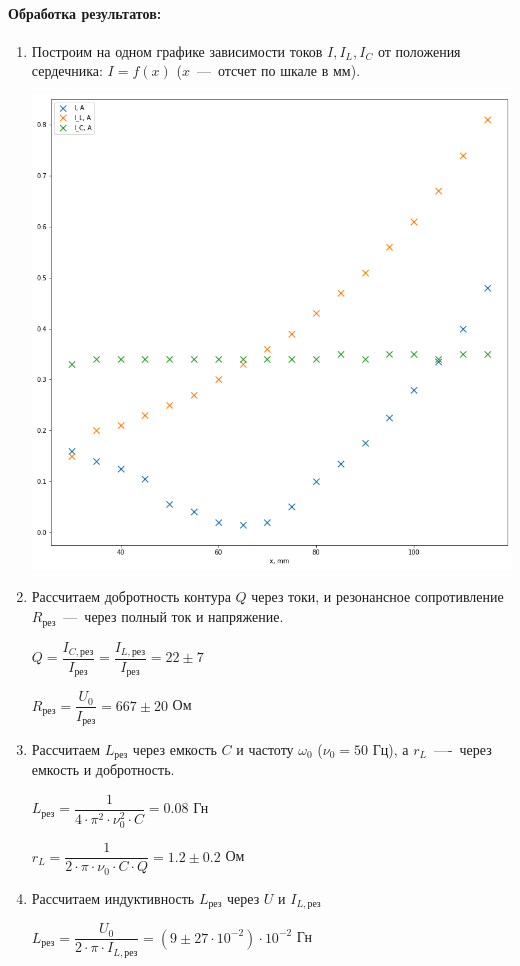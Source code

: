 \documentclass[a4paper, 12pt]{article}
\newcommand{\parag}[1]{\paragraph*{#1:}}
\begin{document}
\newpage

\parag{Обработка результатов} 

\begin{enumerate}
    \item Построим на одном графике зависимости токов $I, I_L, I_C$ от положения сердечника: $I = f(x)$ ($x$~---~отсчет по шкале в мм).
    
    \includegraphics[scale=0.5]{graph.png}
    
    \item Рассчитаем добротность контура $Q$ через токи, и резонансное сопротивление $R_{рез}$~---~через полный ток и напряжение.
    
    $Q = \dfrac{I_{C, рез}}{I_{рез}} = \dfrac{I_{L, рез}}{I_{рез}} = 22 \pm 7$

    $R_{рез} = \dfrac{U_0}{I_{рез}} = 667 \pm 20$ Ом

    \item Рассчитаем $L_{рез}$ через емкость $C$ и частоту $\omega_0$ ($\nu_0 = 50$ Гц), а $r_L$~----~через емкость и добротность.
    
    $L_{рез} = \dfrac{1}{4 \cdot \pi^2 \cdot \nu_0^2 \cdot C} = 0.08$ Гн
    
    $r_L = \dfrac{1}{2 \cdot \pi \cdot \nu_0 \cdot C \cdot Q} = 1.2 \pm 0.2$ Ом

    \item Рассчитаем индуктивность $L_{рез}$ через $U$ и $I_{L, рез}$
    
    $L_{рез} = \dfrac{U_0}{2 \cdot \pi \cdot I_{L, рез}} = (9 \pm 27 \cdot 10^{-2}) \cdot 10^{-2}$ Гн
\end{enumerate}
\end{document}
